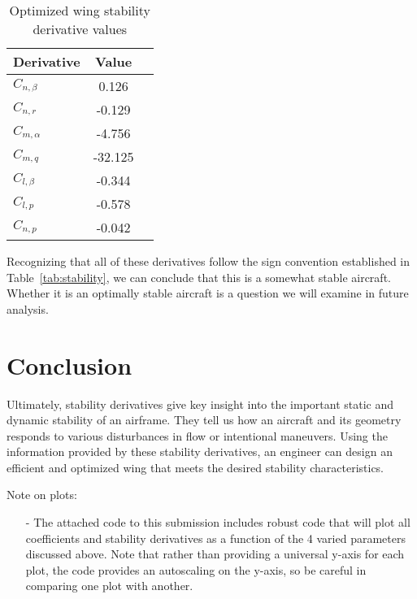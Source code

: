\documentclass{article}
\begin{document}
\begin{table}[H]
    \centering
    \caption{Optimized wing stability derivative values}\label{tab:optimized_derivs}
    \begin{tabular}{l c c}
        \toprule
        \textbf{Derivative} & \textbf{Value} \\
        \midrule
        $C_{n,\beta}$ & 0.126 \\
        $C_{n,r}$ & -0.129 \\
        $C_{m,\alpha}$ & -4.756\\
        $C_{m,q}$ & -32.125 \\
        $C_{l,\beta}$ & -0.344 \\
        $C_{l,p}$ & -0.578 \\
        $C_{n,p}$ & -0.042\\
        \bottomrule
    \end{tabular}
\end{table}

Recognizing that all of these derivatives follow the sign convention established in Table~\ref{tab:stability}, we can conclude that this is a somewhat stable aircraft. Whether it is an optimally stable aircraft is a question we will examine in future analysis.


\section{Conclusion}
Ultimately, stability derivatives give key insight into the important static and dynamic stability of an airframe. 
They tell us how an aircraft and its geometry responds to various disturbances in flow or intentional maneuvers.
Using the information provided by these stability derivatives, an engineer can design an efficient and optimized wing that meets the desired stability characteristics.



Note on plots:
\begin{itemize}
    \item [-] The attached code to this submission includes robust code that will plot all coefficients and stability derivatives as a function of the 4 varied parameters discussed above. Note that rather than providing a universal y-axis for each plot, the code provides an autoscaling on the y-axis, so be careful in comparing one plot with another.
\end{itemize}
\end{document}

